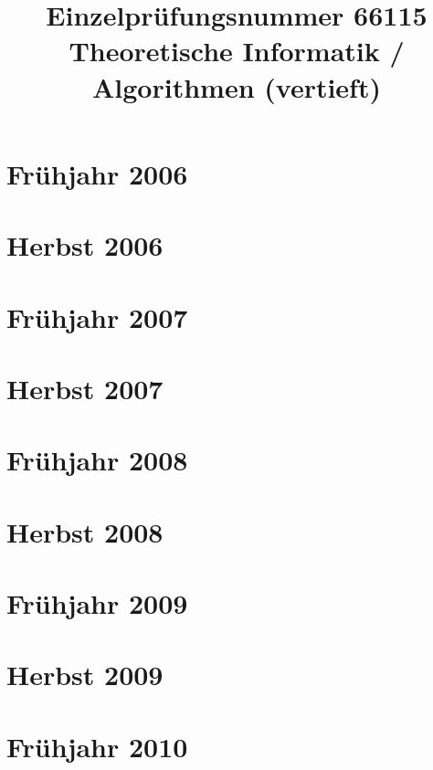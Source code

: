 \documentclass{lehramt-informatik-examen-sammlung}
\title{Einzelprüfungsnummer 66115\\Theoretische Informatik / Algorithmen (vertieft)}
\begin{document}
\maketitle
\tableofcontents

\section{Frühjahr 2006}


\section{Herbst 2006}


\section{Frühjahr 2007}


\section{Herbst 2007}


\section{Frühjahr 2008}


\section{Herbst 2008}


\section{Frühjahr 2009}


\section{Herbst 2009}


\section{Frühjahr 2010}

\end{document}
